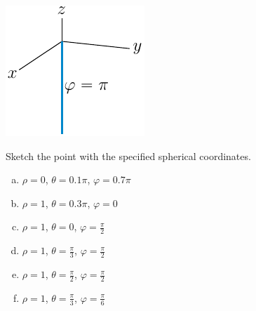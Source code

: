 \begin{solution}
\begin{center}
\end{center}
\begin{center}
\qquad\qquad
   \includegraphics{fig/spherPhiPi.pdf}
\end{center}
\end{solution}


\begin{question}
Sketch the point with the specified spherical coordinates.
\begin{enumerate}[(a)]
\item
$\rho=0$, $\theta=0.1\pi$, $\varphi=0.7\pi$
\item
$\rho=1$, $\theta=0.3\pi$, $\varphi=0$
\item
$\rho=1$, $\theta=0$, $\varphi=\frac{\pi}{2}$
\item
$\rho=1$, $\theta=\frac{\pi}{3}$, $\varphi=\frac{\pi}{2}$
\item
$\rho=1$, $\theta=\frac{\pi}{2}$, $\varphi=\frac{\pi}{2}$
\item
$\rho=1$, $\theta=\frac{\pi}{3}$, $\varphi=\frac{\pi}{6}$
\end{enumerate}

\end{question}

%

